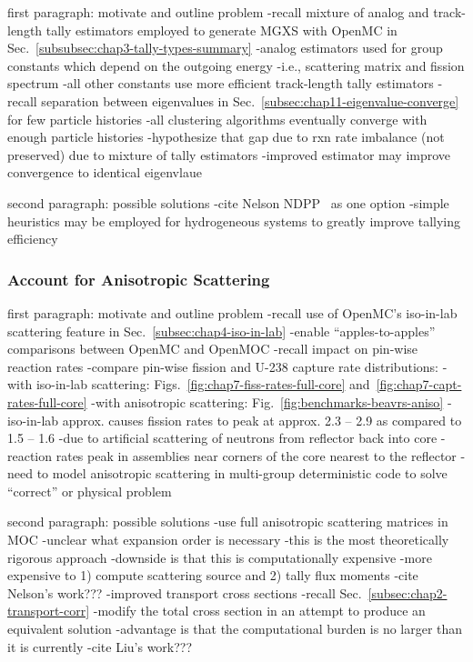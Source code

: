 first paragraph: motivate and outline problem
-recall mixture of analog and track-length tally estimators employed to generate \ac{MGXS} with OpenMC in Sec.~\ref{subsubsec:chap3-tally-types-summary}
  -analog estimators used for group constants which depend on the outgoing energy
    -i.e., scattering matrix and fission spectrum
  -all other constants use more efficient track-length tally estimators
-recall separation between eigenvalues in Sec.~\ref{subsec:chap11-eigenvalue-converge} for few particle histories
  -all clustering algorithms eventually converge with enough particle histories
  -hypothesize that gap due to rxn rate imbalance (not preserved) due to mixture of tally estimators  
  -improved estimator may improve convergence to identical eigenvlaue

second paragraph: possible solutions
-cite Nelson NDPP~\cite{nelson2014improved} as one option
-simple heuristics may be employed for hydrogeneous systems to greatly improve tallying efficiency

\subsubsection{Account for Anisotropic Scattering}
\label{subsubsec:chap12-transport-mgxs}

first paragraph: motivate and outline problem
-recall use of OpenMC's iso-in-lab scattering feature in Sec.~\ref{subsec:chap4-iso-in-lab}
  -enable ``apples-to-apples'' comparisons between OpenMC and OpenMOC
-recall impact on pin-wise reaction rates
  -compare pin-wise fission and U-238 capture rate distributions:
    -with iso-in-lab scattering: Figs.~\ref{fig:chap7-fiss-rates-full-core} and~\ref{fig:chap7-capt-rates-full-core}
    -with anisotropic scattering: Fig.~\ref{fig:benchmarks-beavrs-aniso}
  -iso-in-lab approx. causes fission rates to peak at approx. 2.3 -- 2.9 as compared to 1.5 -- 1.6
    -due to artificial scattering of neutrons from reflector back into core
    -reaction rates peak in assemblies near corners of the core nearest to the reflector
-need to model anisotropic scattering in multi-group deterministic code to solve ``correct'' or physical problem

second paragraph: possible solutions
-use full anisotropic scattering matrices in MOC
  -unclear what expansion order is necessary
  -this is the most theoretically rigorous approach
  -downside is that this is computationally expensive
    -more expensive to 1) compute scattering source and 2) tally flux moments
  -cite Nelson's work???
-improved transport cross sections
  -recall Sec.~\ref{subsec:chap2-transport-corr}
  -modify the total cross section in an attempt to produce an equivalent solution 
  -advantage is that the computational burden is no larger than it is currently
  -cite Liu's work???

